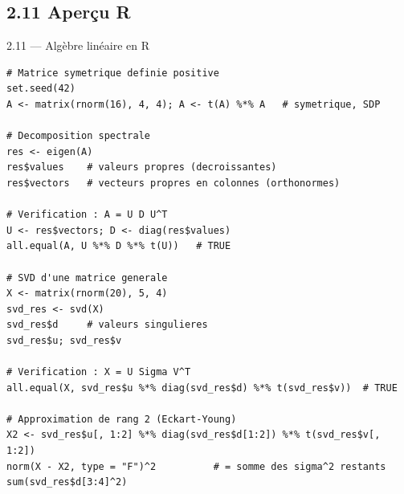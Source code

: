\subsection{2.11 Aperçu R}
\begin{frame}[fragile]{2.11 — Algèbre linéaire en R}
\begin{lstlisting}
# Matrice symetrique definie positive
set.seed(42)
A <- matrix(rnorm(16), 4, 4); A <- t(A) %*% A   # symetrique, SDP

# Decomposition spectrale
res <- eigen(A)
res$values    # valeurs propres (decroissantes)
res$vectors   # vecteurs propres en colonnes (orthonormes)

# Verification : A = U D U^T
U <- res$vectors; D <- diag(res$values)
all.equal(A, U %*% D %*% t(U))   # TRUE

# SVD d'une matrice generale
X <- matrix(rnorm(20), 5, 4)
svd_res <- svd(X)
svd_res$d     # valeurs singulieres
svd_res$u; svd_res$v

# Verification : X = U Sigma V^T
all.equal(X, svd_res$u %*% diag(svd_res$d) %*% t(svd_res$v))  # TRUE

# Approximation de rang 2 (Eckart-Young)
X2 <- svd_res$u[, 1:2] %*% diag(svd_res$d[1:2]) %*% t(svd_res$v[, 1:2])
norm(X - X2, type = "F")^2          # = somme des sigma^2 restants
sum(svd_res$d[3:4]^2)
\end{lstlisting}
\end{frame}

